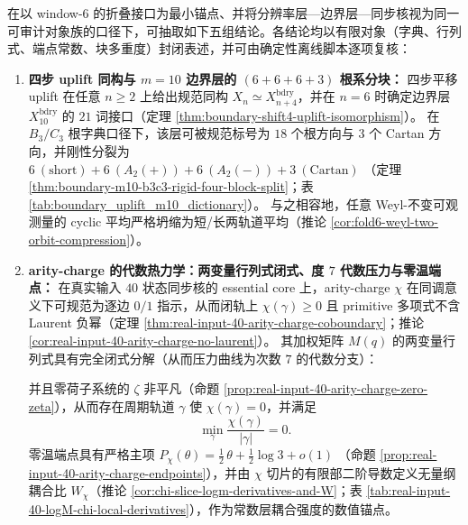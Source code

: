\begin{theorem}\label{thm:window6-unified-skeleton}
在以 window-\(6\) 的折叠接口为最小锚点、并将分辨率层—边界层—同步核视为同一可审计对象族的口径下，可抽取如下五组结论。各结论均以有限对象（字典、行列式、端点常数、块多重度）封闭表述，并可由确定性离线脚本逐项复核：
\begin{enumerate}
  \item \textbf{四步 uplift 同构与 \(m=10\) 边界层的 \texorpdfstring{$(6+6+6+3)$}{(6+6+6+3)} 根系分块：}
  四步平移 uplift 在任意 \(n\ge 2\) 上给出规范同构 \(X_n\simeq X_{n+4}^{\mathrm{bdry}}\)，并在 \(n=6\) 时确定边界层 \(X_{10}^{\mathrm{bdry}}\) 的 \(21\) 词接口（定理 \ref{thm:boundary-shift4-uplift-isomorphism}）。
  在 \(B_3/C_3\) 根字典口径下，该层可被规范标号为 \(18\) 个根方向与 \(3\) 个 Cartan 方向，并刚性分裂为
  \(
  6\ (\mathrm{short})+6\ (A_2(+))+6\ (A_2(-))+3\ (\mathrm{Cartan})
  \)
  （定理 \ref{thm:boundary-m10-b3c3-rigid-four-block-split}；表 \ref{tab:boundary_uplift_m10_dictionary}）。
  与之相容地，任意 Weyl-不变可观测量的 cyclic 平均严格坍缩为短/长两轨道平均（推论 \ref{cor:fold6-weyl-two-orbit-compression}）。

  \item \textbf{arity-charge 的代数热力学：两变量行列式闭式、度 \(7\) 代数压力与零温端点：}
  在真实输入 \(40\) 状态同步核的 essential core 上，arity-charge \(\chi\) 在同调意义下可规范为逐边 \(0/1\) 指示，从而闭轨上 \(\chi(\gamma)\ge 0\) 且 primitive 多项式不含 Laurent 负幂（定理 \ref{thm:real-input-40-arity-charge-coboundary}；推论 \ref{cor:real-input-40-arity-charge-no-laurent}）。
  其加权矩阵 \(M(q)\) 的两变量行列式具有完全闭式分解（从而压力曲线为次数 \(7\) 的代数分支）：
  
  并且零荷子系统的 \(\zeta\) 非平凡（命题 \ref{prop:real-input-40-arity-charge-zero-zeta}），从而存在周期轨道 \(\gamma\) 使 \(\chi(\gamma)=0\)，并满足
  \[
  \min_{\gamma}\frac{\chi(\gamma)}{|\gamma|}=0.
  \]
  零温端点具有严格主项
  \(
  P_\chi(\theta)=\tfrac12\,\theta+\tfrac12\log 3+o(1)
  \)
  （命题 \ref{prop:real-input-40-arity-charge-endpoints}），并由 \(\chi\) 切片的有限部二阶导数定义无量纲耦合比
  \(W_\chi\)（推论 \ref{cor:chi-slice-logm-derivatives-and-W}；表 \ref{tab:real-input-40-logM-chi-local-derivatives}），作为常数层耦合强度的数值锚点。


\end{enumerate}
\end{theorem}
